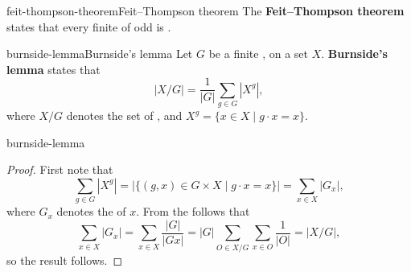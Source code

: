 \begin{topic}{feit-thompson-theorem}{Feit--Thompson theorem}
    The \textbf{Feit--Thompson theorem} states that every finite  of odd  is .
\end{topic}

\begin{topic}{burnside-lemma}{Burnside's lemma}
    Let $G$ be a finite ,  on a set $X$. \textbf{Burnside's lemma} states that
    \[ |X/G| = \frac{1}{|G|} \sum_{g \in G} |X^g| , \]
    where $X/G$ denotes the set of , and $X^g = \{ x \in X \mid g \cdot x = x \}$.
\end{topic}

\begin{example}{burnside-lemma}
    \begin{proof}
        First note that
        \[ \sum_{g \in G} |X^g| = |\{ (g, x) \in G \times X \mid g \cdot x = x \}| = \sum_{x \in X} |G_x| , \]
        where $G_x$ denotes the  of $x$. From the  follows that
        \[ \sum_{x \in X} |G_x| = \sum_{x \in X} \frac{|G|}{|G x|} = |G| \sum_{O \in X/G} \sum_{x \in O} \frac{1}{|O|} = |X/G| , \]
        so the result follows.
    \end{proof}
\end{example}
